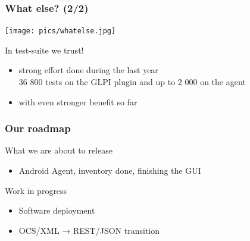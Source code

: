 \documentclass{beamer}
\begin{document}
\begin{frame}
    \frametitle{What else? (2/2)}

    \begin{center}
    \texttt{[image: pics/whatelse.jpg]}
    \end{center}

    \begin{block}{In test-suite we trust!}
        \begin{itemize}
            \item strong effort done during the last year \\
            \small{36 800 tests on the GLPI plugin and up to 2 000 on the agent}
            \item with even stronger benefit so far
        \end{itemize}
    \end{block}
\end{frame}

\begin{frame}
    \frametitle{Our roadmap}

    What we are about to release
    \begin{itemize}
    \item Android Agent, inventory done, finishing the GUI 
    \end{itemize}

    Work in progress
    \begin{itemize}
    \item Software deployment
    \item OCS/XML → REST/JSON transition
    \end{itemize}
\end{frame}
\end{document}
